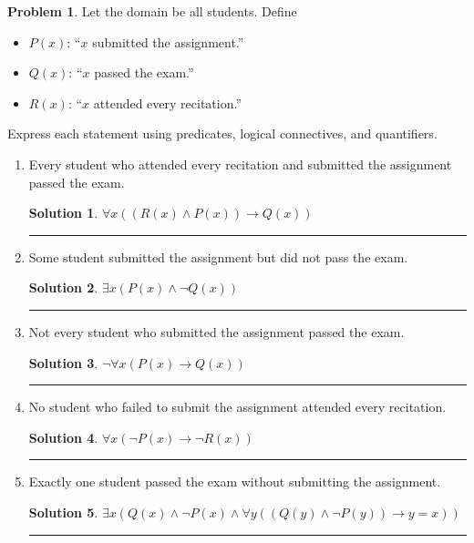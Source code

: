 \documentclass{article}
\theoremstyle{definition}
\newtheorem{problem}{Problem}
\def\fline{\rule{0.75\linewidth}{0.5pt}}
\newcommand{\finishline}{\begin{center}\fline\end{center}}
\newtheorem*{solution*}{Solution}
\newenvironment{solution}{\begin{solution*}}{{\finishline} \end{solution*}}
\begin{document}
\begin{problem}
Let the domain be all students. Define
\begin{itemize}
    \item $P(x)$: ``$x$ submitted the assignment.''
    \item $Q(x)$: ``$x$ passed the exam.''
    \item $R(x)$: ``$x$ attended every recitation.''
\end{itemize}

Express each statement using predicates, logical connectives, and quantifiers.

\begin{enumerate}[label=\alph*)]
    \item Every student who attended every recitation and submitted the
    assignment passed the exam.

    \begin{solution}
$\forall x ((R(x) \land P(x)) \rightarrow Q(x))$


    \end{solution}

    \item Some student submitted the assignment but did not pass the exam.

    \begin{solution}
$\exists x (P(x) \land \neg Q(x))$


    \end{solution}

    \item Not every student who submitted the assignment passed the exam.

    \begin{solution}
$\neg \forall x (P(x) \rightarrow Q(x))$


    \end{solution}

    \item No student who failed to submit the assignment attended every
    recitation.

    \begin{solution}

$\forall x (\neg P(x) \rightarrow \neg R(x))$

    \end{solution}

    \item Exactly one student passed the exam without submitting the assignment.

    \begin{solution}

$\exists x (Q(x) \land \neg P(x) \land \forall y ((Q(y) \land \neg P(y)) \rightarrow y = x))$

    \end{solution}
\end{enumerate}
\end{problem}
\end{document}
